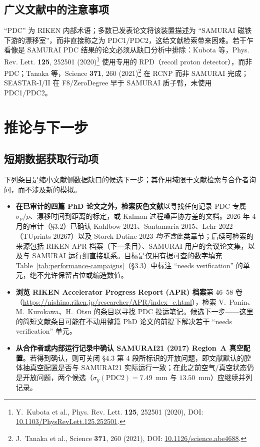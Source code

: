 \documentclass[a4paper, 11pt]{article}
\begin{document}
\subsection{广义文献中的注意事项}
``PDC'' 为 RIKEN 内部术语；多数已发表论文将该装置描述为 ``SAMURAI 磁铁下游的漂移室''，而非直接称之为 PDC1/PDC2，这给文献检索带来困难。若干乍看像是 SAMURAI PDC 结果的论文必须从缺口分析中排除：Kubota 等，Phys. Rev. Lett. \textbf{125}, 252501 (2020)\footnote{\label{fn:kubota2020}Y.~Kubota et al., Phys. Rev. Lett. \textbf{125}, 252501 (2020), DOI: \href{https://doi.org/10.1103/PhysRevLett.125.252501}{10.1103/PhysRevLett.125.252501}.} 使用专用的 RPD（recoil proton detector），而非 PDC；Tanaka 等，Science \textbf{371}, 260 (2021)\footnote{\label{fn:tanaka2021}J.~Tanaka et al., Science \textbf{371}, 260 (2021), DOI: \href{https://doi.org/10.1126/science.abe4688}{10.1126/science.abe4688}.} 在 RCNP 而非 SAMURAI 完成；SEASTAR-I/II 在 F8/ZeroDegree 早于 SAMURAI 质子臂，未使用 PDC1/PDC2。

\section{推论与下一步}
\subsection{短期数据获取行动项}
下列条目是缩小文献侧数据缺口的候选下一步；其作用域限于文献检索与合作者询问，而不涉及新的模拟。
\begin{itemize}
  \item \textbf{在已审计的四篇 PhD 论文之外，检索灰色文献}以寻找任何记录 PDC 专属 $\sigma_p/p$、漂移时间到距离的标定，或 Kalman 过程噪声协方差的文档。2026 年 4 月的审计（§3.2）已确认 Kahlbow 2021、Santamaria 2015、Lehr 2022（TUprints 20267）以及 Storck-Dutine 2023 \emph{均不含}此类章节；后续可检索的来源包括 RIKEN APR 档案（下一条目）、SAMURAI 用户的会议论文集，以及与 SAMURAI 运行组直接联系。目标是仅用有据可查的数字填充 Table~\ref{tab:performance-campaigns}（§3.3）中标注 ``needs verification'' 的单元，绝不允许保留占位或编造数值。
  \item \textbf{浏览 RIKEN Accelerator Progress Report (APR) 档案}第 46--58 卷（\url{https://nishina.riken.jp/researcher/APR/index_e.html}），检索 V.~Panin、M.~Kurokawa、H.~Otsu 的条目以寻找 PDC 投运笔记。候选下一步——这里的简短文献条目可能在不动用整篇 PhD 论文的前提下解决若干 ``needs verification'' 单元。
  \item \textbf{从合作者或内部运行记录中确认 SAMURAI21 (2017) Region~A 真空配置}。若得到确认，则可关闭 §4.3 第 4 段所标识的开放问题，即文献默认的腔体抽真空配置是否与 SAMURAI21 实际运行一致；在此之前空气/真空状态仍是开放问题，两个候选（$\sigma_y(\text{PDC2}) = 7.49$~mm 与 $13.50$~mm）应继续并列记录。
\end{itemize}
\end{document}
